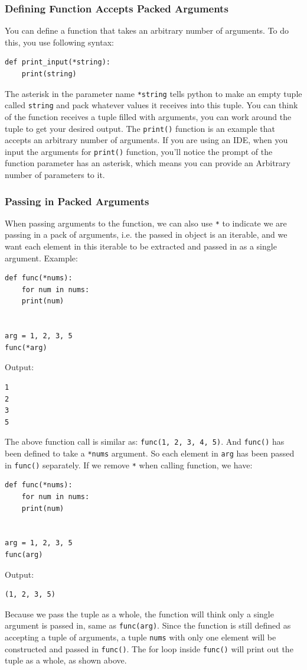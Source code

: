 \documentclass[12pt]{book}
\begin{document}
\subsubsection{Defining Function Accepts Packed Arguments}
\label{sec:org2b224d0}
You can define a function that takes an arbitrary number of arguments. To do this, you use following syntax:
\begin{verbatim}
def print_input(*string):
    print(string)
\end{verbatim}
The asterisk in the parameter name \texttt{*string} tells python to make an empty tuple called \texttt{string} and pack whatever values it receives into this tuple. You can think of the function receives a tuple filled with arguments, you can work around the tuple to get your desired output. The \texttt{print()} function is an example that accepts an arbitrary number of arguments. If you are using an IDE, when you input the arguments for \texttt{print()} function, you'll notice the prompt of the function parameter has an asterisk, which means you can provide an Arbitrary number of parameters to it.

\subsubsection{Passing in Packed Arguments}
\label{sec:org1d989fb}
When passing arguments to the function, we can also use \texttt{*} to indicate we are passing in a pack of arguments, i.e. the passed in object is an iterable, and we want each element in this iterable to be extracted and passed in as a single argument. Example:
\begin{verbatim}
def func(*nums):
    for num in nums:
	print(num)


arg = 1, 2, 3, 5
func(*arg)
\end{verbatim}
Output:
\begin{verbatim}
1
2
3
5
\end{verbatim}
The above function call is similar as: \texttt{func(1, 2, 3, 4, 5)}. And \texttt{func()} has been defined to take a \texttt{*nums} argument. So each element in \texttt{arg} has been passed in \texttt{func()} separately. If we remove \texttt{*} when calling function, we have:
\begin{verbatim}
def func(*nums):
    for num in nums:
	print(num)


arg = 1, 2, 3, 5
func(arg)
\end{verbatim}
Output:
\begin{verbatim}
(1, 2, 3, 5)
\end{verbatim}
Because we pass the tuple as a whole, the function will think only a single argument is passed in, same as \texttt{func(arg)}. Since the function is still defined as accepting a tuple of arguments, a tuple \texttt{nums}  with only one element will be constructed and passed in \texttt{func()}. The for loop inside \texttt{func()} will print out the tuple as a whole, as shown above.
\end{document}
